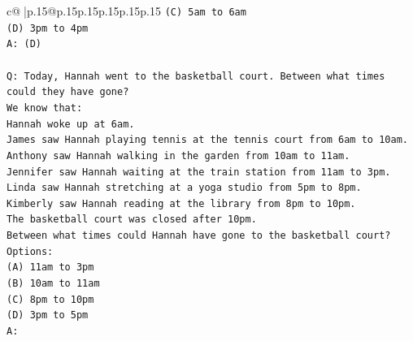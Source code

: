 \documentclass{article}
\begin{document}
{\begin{supertabular}{c@{$\;$}|p{.15\linewidth}@{}p{.15\linewidth}p{.15\linewidth}p{.15\linewidth}p{.15\linewidth}p{.15\linewidth}}
{{{\texttt{(C) 5am to 6am} \\
\texttt{(D) 3pm to 4pm} \\
\texttt{A: (D)} \\
\\ 
\texttt{Q: Today, Hannah went to the basketball court. Between what times could they have gone?} \\
\texttt{We know that:} \\
\texttt{Hannah woke up at 6am.} \\
\texttt{James saw Hannah playing tennis at the tennis court from 6am to 10am.} \\
\texttt{Anthony saw Hannah walking in the garden from 10am to 11am.} \\
\texttt{Jennifer saw Hannah waiting at the train station from 11am to 3pm.} \\
\texttt{Linda saw Hannah stretching at a yoga studio from 5pm to 8pm.} \\
\texttt{Kimberly saw Hannah reading at the library from 8pm to 10pm.} \\
\texttt{The basketball court was closed after 10pm.} \\
\texttt{Between what times could Hannah have gone to the basketball court?} \\
\texttt{Options:} \\
\texttt{(A) 11am to 3pm} \\
\texttt{(B) 10am to 11am} \\
\texttt{(C) 8pm to 10pm} \\
\texttt{(D) 3pm to 5pm} \\
\texttt{A:} \\
            }
        }
    }
     \\ \\


\end{supertabular}}
\end{document}
